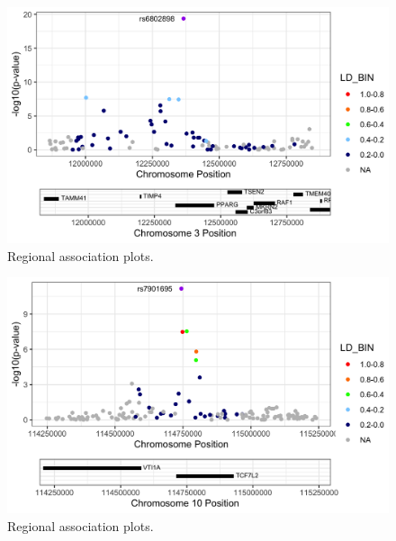 \documentclass[
]{book}
\begin{document}
\begin{figure}

{\centering \includegraphics[width=25.25in]{img/_gwas/rs6802898.rs6802898.regional_assoc} 

}

\caption{Regional association plots.}\label{fig:show-racer}
\end{figure}
\begin{figure}

{\centering \includegraphics[width=25.25in]{img/_gwas/rs7901695.rs7901695.regional_assoc} 

}

\caption{Regional association plots.}\label{fig:show-racer}
\end{figure}
\end{document}
